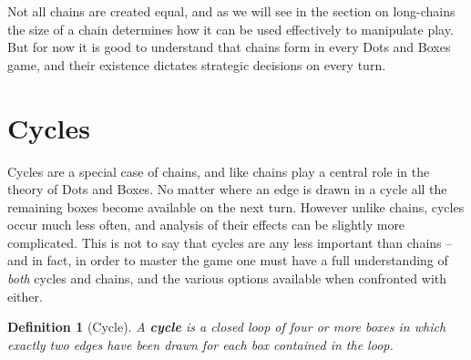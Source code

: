 \documentclass[12pt,twoside]{reedthesis}
\newtheorem{mydef}{Definition}
\begin{document}
Not all chains are created equal, and as we will see in the section on long-chains the size of a chain determines how it can be used effectively to manipulate play.  But for now it is good to understand that chains form in every Dots and Boxes game, and their existence dictates strategic decisions on every turn.

\section{Cycles}
Cycles are a special case of chains, and like chains play a central role in the theory of Dots and Boxes.  No matter where an edge is drawn in a cycle all the remaining boxes become available on the next turn.  However unlike chains, cycles occur much less often, and analysis of their effects can be slightly more complicated.  This is not to say that cycles are any less important than chains -- and in fact, in order to master the game one must have a full understanding of \emph{both} cycles and chains, and the various options available when confronted with either.

\begin{mydef}[Cycle]
A \textbf{cycle} is a closed loop of four or more boxes in which exactly two edges have been drawn for each box contained in the loop.
\end{mydef}
\end{document}
